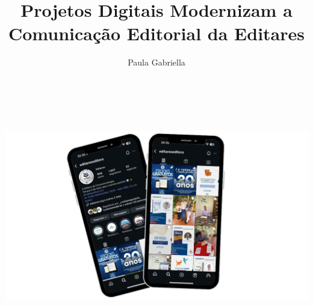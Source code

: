 \documentclass{gescons}
\author{Paula Gabriella}
\title{Projetos Digitais Modernizam a Comunicação Editorial da Editares}
\begin{document}
    \makeentrevistatitle


    
    
\begin{center}
    \includegraphics[height=10cm]{articles/atualizacoes/fotos/materia5/Instagram-Editares.png} 
\end{center}
    
\end{document}
